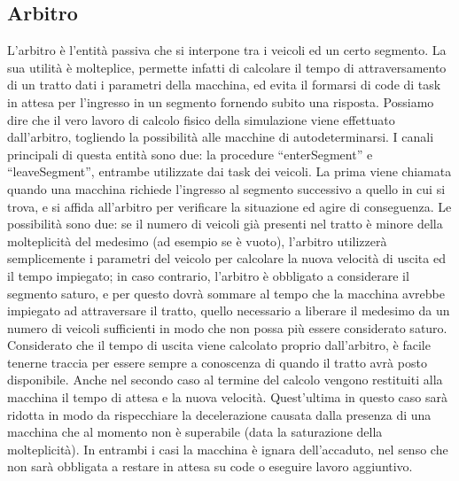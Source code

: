 \subsection{Arbitro}

L’arbitro è l’entità passiva che si interpone tra i veicoli ed un certo segmento. La sua utilità è molteplice, permette infatti di calcolare il tempo di attraversamento di un tratto dati i parametri della macchina, ed evita il formarsi di code di task in attesa per l’ingresso in un segmento fornendo subito una risposta. Possiamo dire che il vero lavoro di calcolo fisico della simulazione viene effettuato dall’arbitro, togliendo la possibilità alle macchine di autodeterminarsi.
I canali principali di questa entità sono due: la procedure “enterSegment” e “leaveSegment”, entrambe utilizzate dai task dei veicoli.
La prima viene chiamata quando una macchina richiede l’ingresso al segmento successivo a quello in cui si trova, e si affida all’arbitro per verificare la situazione ed agire di conseguenza.
Le possibilità sono due: se il numero di veicoli già presenti nel tratto è minore della molteplicità del medesimo (ad esempio se è vuoto), l’arbitro utilizzerà semplicemente i parametri del veicolo per calcolare la nuova velocità di uscita ed il tempo impiegato; in caso contrario, l’arbitro è obbligato a considerare il segmento saturo, e per questo dovrà sommare al tempo che la macchina avrebbe impiegato ad attraversare il tratto,  quello necessario a liberare il medesimo da un numero di veicoli sufficienti in modo che non possa più essere considerato saturo. Considerato che il tempo di uscita viene calcolato proprio dall’arbitro, è facile tenerne traccia per essere sempre a conoscenza di quando il tratto avrà posto disponibile. Anche nel secondo caso al termine del calcolo vengono restituiti alla macchina il tempo di attesa e la nuova velocità. Quest’ultima in questo caso sarà ridotta in modo da rispecchiare la decelerazione causata dalla presenza di una macchina che al momento non è superabile (data la saturazione della molteplicità).
In entrambi i casi la macchina è ignara dell’accaduto, nel senso che non sarà obbligata a restare in attesa su code o eseguire lavoro aggiuntivo. \\
